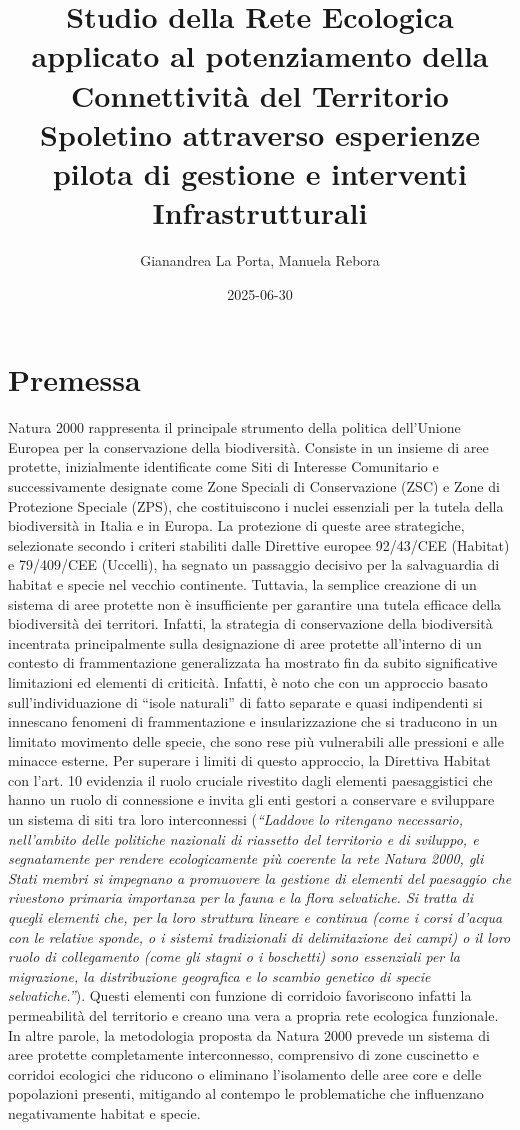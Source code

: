 \documentclass[
]{book}
\title{Studio della Rete Ecologica applicato al potenziamento della Connettività del Territorio Spoletino attraverso esperienze pilota di gestione e interventi Infrastrutturali}
\author{Gianandrea La Porta, Manuela Rebora}
\date{2025-06-30}
\begin{document}
\maketitle

{
\setcounter{tocdepth}{1}
\tableofcontents
}
\chapter{Premessa}\label{premessa}

Natura 2000 rappresenta il principale strumento della politica dell'Unione Europea per la conservazione della biodiversità. Consiste in un insieme di aree protette, inizialmente identificate come Siti di Interesse Comunitario e successivamente designate come Zone Speciali di Conservazione (ZSC) e Zone di Protezione Speciale (ZPS), che costituiscono i nuclei essenziali per la tutela della biodiversità in Italia e in Europa. La protezione di queste aree strategiche, selezionate secondo i criteri stabiliti dalle Direttive europee 92/43/CEE (Habitat) e 79/409/CEE (Uccelli), ha segnato un passaggio decisivo per la salvaguardia di habitat e specie nel vecchio continente. Tuttavia, la semplice creazione di un sistema di aree protette non è insufficiente per garantire una tutela efficace della biodiversità dei territori. Infatti, la strategia di conservazione della biodiversità incentrata principalmente sulla designazione di aree protette all'interno di un contesto di frammentazione generalizzata ha mostrato fin da subito significative limitazioni ed elementi di criticità. Infatti, è noto che con un approccio basato sull'individuazione di ``isole naturali'' di fatto separate e quasi indipendenti si innescano fenomeni di frammentazione e insularizzazione che si traducono in un limitato movimento delle specie, che sono rese più vulnerabili alle pressioni e alle minacce esterne. Per superare i limiti di questo approccio, la Direttiva Habitat con l'art. 10 evidenzia il ruolo cruciale rivestito dagli elementi paesaggistici che hanno un ruolo di connessione e invita gli enti gestori a conservare e sviluppare un sistema di siti tra loro interconnessi (\emph{``Laddove lo ritengano necessario, nell'ambito delle politiche nazionali di riassetto del territorio e di sviluppo, e segnatamente per rendere ecologicamente più coerente la rete Natura 2000, gli Stati membri si impegnano a promuovere la gestione di elementi del paesaggio che rivestono primaria importanza per la fauna e la flora selvatiche. Si tratta di quegli elementi che, per la loro struttura lineare e continua (come i corsi d'acqua con le relative sponde, o i sistemi tradizionali di delimitazione dei campi) o il loro ruolo di collegamento (come gli stagni o i boschetti) sono essenziali per la migrazione, la distribuzione geografica e lo scambio genetico di specie selvatiche.''}). Questi elementi con funzione di corridoio favoriscono infatti la permeabilità del territorio e creano una vera a propria rete ecologica funzionale. In altre parole, la metodologia proposta da Natura 2000 prevede un sistema di aree protette completamente interconnesso, comprensivo di zone cuscinetto e corridoi ecologici che riducono o eliminano l'isolamento delle aree core e delle popolazioni presenti, mitigando al contempo le problematiche che influenzano negativamente habitat e specie.
\end{document}
